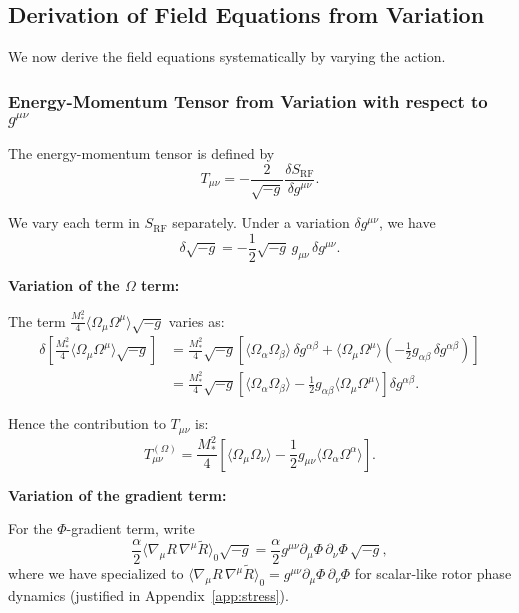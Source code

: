 \documentclass[11pt,a4paper]{article}
\numberwithin{equation}{section}
\theoremstyle{plain}
\theoremstyle{definition}
\theoremstyle{remark}
\begin{document}
\subsection{Derivation of Field Equations from Variation}

We now derive the field equations systematically by varying the action.

\subsubsection{Energy-Momentum Tensor from Variation with respect to $g^{\mu\nu}$}

The energy-momentum tensor is defined by
\begin{equation}
T_{\mu\nu} = -\frac{2}{\sqrt{-g}}\frac{\delta S_{\mathrm{RF}}}{\delta g^{\mu\nu}}.
\label{eq:Tmunu-def}
\end{equation}

We vary each term in $S_{\mathrm{RF}}$ separately. Under a variation $\delta g^{\mu\nu}$, we have
\begin{equation}
\delta\sqrt{-g} = -\frac{1}{2}\sqrt{-g}\,g_{\mu\nu}\,\delta g^{\mu\nu}.
\label{eq:sqrt-g-variation}
\end{equation}

\textbf{Variation of the $\Omega$ term:}

The term $\frac{M_*^2}{4}\langle \Omega_\mu \Omega^\mu \rangle\sqrt{-g}$ varies as:
\begin{align}
\delta\left[\frac{M_*^2}{4}\langle \Omega_\mu \Omega^\mu \rangle\sqrt{-g}\right] &= \frac{M_*^2}{4}\sqrt{-g}\left[\langle \Omega_\alpha \Omega_\beta \rangle\,\delta g^{\alpha\beta} + \langle \Omega_\mu \Omega^\mu \rangle\left(-\frac{1}{2}g_{\alpha\beta}\,\delta g^{\alpha\beta}\right)\right]\\
&= \frac{M_*^2}{4}\sqrt{-g}\left[\langle \Omega_\alpha \Omega_\beta \rangle - \frac{1}{2}g_{\alpha\beta}\langle \Omega_\mu \Omega^\mu \rangle\right]\delta g^{\alpha\beta}.
\end{align}

Hence the contribution to $T_{\mu\nu}$ is:
\begin{equation}
T_{\mu\nu}^{(\Omega)} = \frac{M_*^2}{4}\left[\langle \Omega_\mu \Omega_\nu \rangle - \frac{1}{2}g_{\mu\nu}\langle \Omega_\alpha \Omega^\alpha \rangle\right].
\label{eq:Tmunu-Omega}
\end{equation}

\textbf{Variation of the gradient term:}

For the $\Phi$-gradient term, write
\begin{equation}
\frac{\alpha}{2}\langle \nabla_\mu R\,\nabla^\mu \widetilde{R} \rangle_0\sqrt{-g} = \frac{\alpha}{2}g^{\mu\nu}\partial_\mu\Phi\,\partial_\nu\Phi\,\sqrt{-g},
\end{equation}
where we have specialized to $\langle \nabla_\mu R\,\nabla^\mu \widetilde{R} \rangle_0 = g^{\mu\nu}\partial_\mu\Phi\,\partial_\nu\Phi$ for scalar-like rotor phase dynamics (justified in Appendix~\ref{app:stress}).
\end{document}
